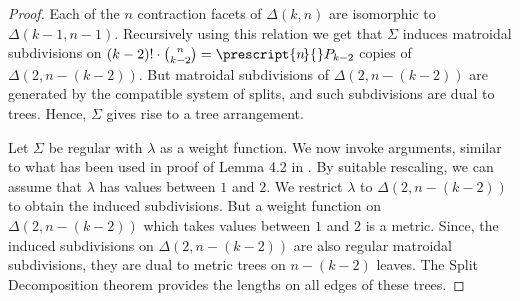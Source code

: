 \documentclass[12pt]{article}
\theoremstyle{plain}
\theoremstyle{definition}
\numberwithin{subcase}{case}
\newcommand\Myperm[2][^n]{\prescript{#1\mkern-2.5mu}{}P_{#2}}
\begin{document}
\begin{proof}
Each of the $n$ contraction facets of $\Delta(k,n)$ are  isomorphic to $\Delta(k-1,n-1)$. Recursively using this relation we get that $\Sigma$ induces matroidal subdivisions on $(k-2)! \cdot {\binom{n}{k-2}} = \Myperm[n]{k-2}$ copies of $\Delta(2,n-(k-2))$. But matroidal subdivisions of $\Delta(2,n-(k-2))$ are generated by the compatible system of splits, and such subdivisions are dual to trees. Hence, $\Sigma$ gives rise to a tree arrangement.

Let $\Sigma$ be regular with $\lambda$ as a weight function. We now invoke arguments, similar to what has been used in proof of Lemma 4.2 in \cite{herrmann2009draw}. By suitable rescaling, we can assume that $\lambda$ has values between $1$ and $2$. We restrict $\lambda$ to $\Delta(2,n-(k-2))$ to obtain the induced subdivisions. But a weight function on $\Delta(2,n-(k-2))$ which takes values between $1$ and $2$ is a metric. Since, the induced subdivisions on $\Delta(2,n-(k-2))$ are also regular matroidal subdivisions, they are dual to metric trees on $n-(k-2)$ leaves. The Split Decomposition theorem \cite[Theorem 2.11]{herrmann2008splitting} provides the lengths on all edges of these trees.
\end{proof}
\end{document}
